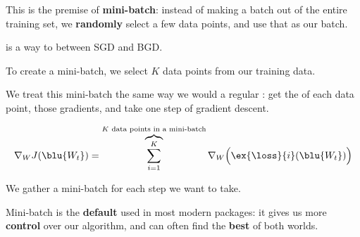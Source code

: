             This is the premise of \textbf{mini-batch}: instead of making a batch out of the entire training set, we \textbf{randomly} select a few data points, and use that as our batch.\\
            
            \begin{definition}
                 is a way to  between SGD and BGD.
                
                To create a mini-batch, we  select $K$ data points from our training data. 
                
                We treat this mini-batch the same way we would a regular : get the  of each data point,  those gradients, and take one  step of gradient descent.
                
                \begin{equation*}
                    \nabla_W J ( \blu{ W_t } )
                    =
                    \overbrace{
                        \sum_{i=1}^K
                    }^{K \text{ data points in a mini-batch}} 
                    \nabla_W
                    \Big(
                        \ex{\loss}{i}(\blu{ W_t })
                    \Big)
                \end{equation*}
                
                We gather a  mini-batch for each step we want to take.
            \end{definition}
            
            Mini-batch is the \textbf{default} used in most modern packages: it gives us more \textbf{control} over our algorithm, and can often find the \textbf{best} of both worlds.\\
            
